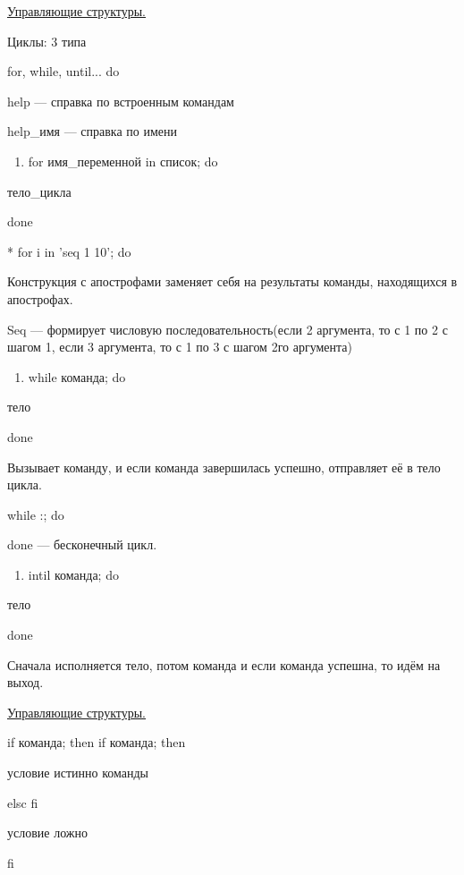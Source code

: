 \par 
\underline{Управляющие структуры.}
\par 
Циклы: 3 типа
\par 
for, while, until... do
\par 
help — справка по встроенным командам
\par 
help\_имя — справка по имени
\begin{enumerate}
	\item \par 
	for имя\_переменной in список; do
\end{enumerate}
\par 
тело\_цикла
\par 
done
\par 
* for i in 'seq 1 10'; do
\par 
Конструкция с апострофами заменяет
себя на результаты команды, находящихся
в апострофах.
\par 
Seq — формирует числовую последовательность(если
2 аргумента, то с 1 по 2 с шагом 1, если 3
аргумента, то с 1 по 3 с шагом 2го аргумента)
\begin{enumerate}
	\item \par 
	while команда; do
\end{enumerate}
\par 
тело
\par 
done
\par 
Вызывает команду, и если команда
завершилась успешно, отправляет её в
тело цикла.
\par 
while :; do 

\par 
done — бесконечный цикл.
\begin{enumerate}
	\item \par 
	intil команда; do
\end{enumerate}
\par 
тело
\par 
done
\par 
Сначала исполняется тело, потом команда
и если команда успешна, то идём на выход.

\par 
\underline{Управляющие структуры.}
\par 
if
команда; then                                               if
команда; then
\par 
условие истинно                                        
      команды
\par 
elsc                                                                 
    fi
\par 
условие ложно
\par 
fi


